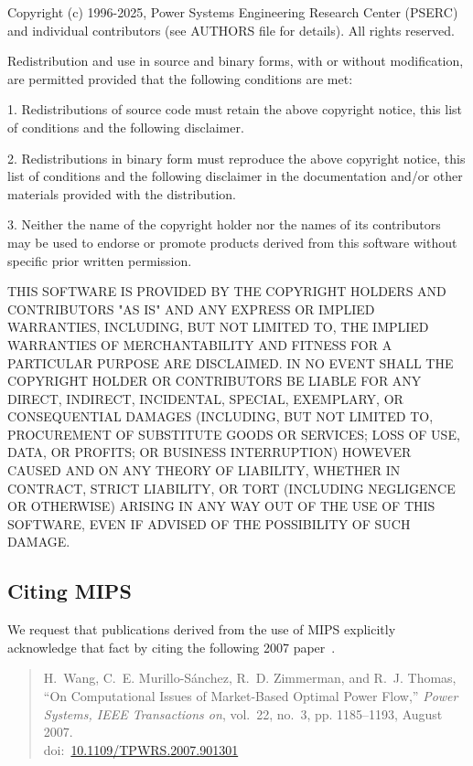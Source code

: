 \documentclass[12pt]{article}
\newcommand{\mips}[0]{{MIPS}}
\newcommand{\doi}[1]{doi:~\href{https://doi.org/#1}{#1}}
\numberwithin{equation}{section}
\numberwithin{table}{section}
\numberwithin{figure}{section}
\begin{document}
\begin{Notice}
Copyright (c) 1996-2025, Power Systems Engineering Research Center
(PSERC) and individual contributors (see AUTHORS file for details).
All rights reserved.

Redistribution and use in source and binary forms, with or without
modification, are permitted provided that the following conditions
are met:

1. Redistributions of source code must retain the above copyright
notice, this list of conditions and the following disclaimer.

2. Redistributions in binary form must reproduce the above copyright
notice, this list of conditions and the following disclaimer in the
documentation and/or other materials provided with the distribution.

3. Neither the name of the copyright holder nor the names of its
contributors may be used to endorse or promote products derived from
this software without specific prior written permission.

THIS SOFTWARE IS PROVIDED BY THE COPYRIGHT HOLDERS AND CONTRIBUTORS
"AS IS" AND ANY EXPRESS OR IMPLIED WARRANTIES, INCLUDING, BUT NOT
LIMITED TO, THE IMPLIED WARRANTIES OF MERCHANTABILITY AND FITNESS
FOR A PARTICULAR PURPOSE ARE DISCLAIMED. IN NO EVENT SHALL THE
COPYRIGHT HOLDER OR CONTRIBUTORS BE LIABLE FOR ANY DIRECT, INDIRECT,
INCIDENTAL, SPECIAL, EXEMPLARY, OR CONSEQUENTIAL DAMAGES (INCLUDING,
BUT NOT LIMITED TO, PROCUREMENT OF SUBSTITUTE GOODS OR SERVICES;
LOSS OF USE, DATA, OR PROFITS; OR BUSINESS INTERRUPTION) HOWEVER
CAUSED AND ON ANY THEORY OF LIABILITY, WHETHER IN CONTRACT, STRICT
LIABILITY, OR TORT (INCLUDING NEGLIGENCE OR OTHERWISE) ARISING IN
ANY WAY OUT OF THE USE OF THIS SOFTWARE, EVEN IF ADVISED OF THE
POSSIBILITY OF SUCH DAMAGE.
\end{Notice}

\subsection{Citing \mips{}}

We request that publications derived from the use of \mips{} explicitly acknowledge that fact by citing the following 2007 paper~\cite{wang2007a}.

\begin{quote}
\footnotesize
H.~Wang, C.~E. Murillo-S{\'a}nchez, R.~D. Zimmerman, and R.~J. Thomas, ``On
Computational Issues of Market-Based Optimal Power Flow,'' \emph{Power
Systems, IEEE Transactions on}, vol.~22, no.~3, pp. 1185--1193, August 2007.\\
\doi{10.1109/TPWRS.2007.901301}
\end{quote}
\end{document}

